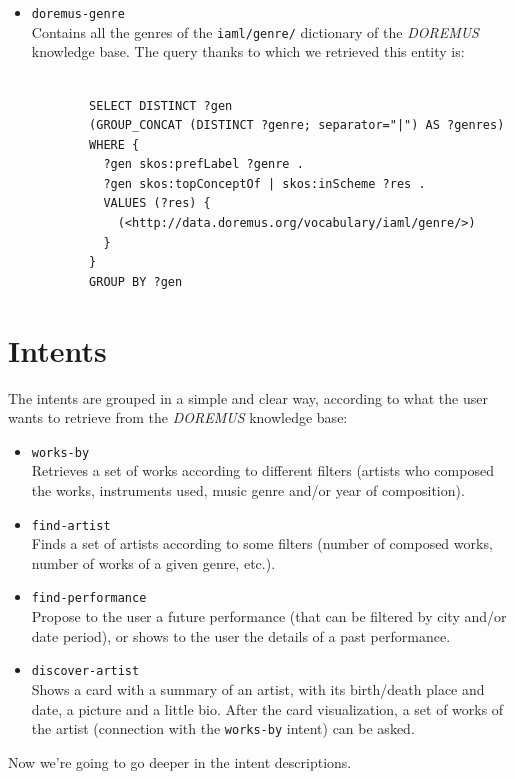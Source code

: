 \documentclass[a4paper,12pt]{report}
\begin{document}
\begin{itemize}
		\item \texttt{doremus-genre}\\
		Contains all the genres of the \texttt{iaml/genre/} dictionary of the \textit{DOREMUS} knowledge base. The query thanks to which we retrieved this entity is:
		\begin{lstlisting}
		
		SELECT DISTINCT ?gen
		(GROUP_CONCAT (DISTINCT ?genre; separator="|") AS ?genres)
		WHERE {
		  ?gen skos:prefLabel ?genre .
		  ?gen skos:topConceptOf | skos:inScheme ?res .
		  VALUES (?res) {
		    (<http://data.doremus.org/vocabulary/iaml/genre/>)
		  }
		}
		GROUP BY ?gen
		\end{lstlisting}
	\end{itemize}

	\section{Intents}
	The intents are grouped in a simple and clear way, according to what the user wants to retrieve from the \textit{DOREMUS} knowledge base:
	\begin{itemize}
		\item \texttt{works-by}\\
		Retrieves a set of works according to different filters (artists who composed the works, instruments used, music genre and/or year of composition).
		\item \texttt{find-artist}\\
		Finds a set of artists according to some filters (number of composed works, number of works of a given genre, etc.).
		\item \texttt{find-performance}\\
		Propose to the user a future performance (that can be filtered by city and/or date period), or shows to the user the details of a past performance.
		\item \texttt{discover-artist}\\
		Shows a card with a summary of an artist, with its birth/death place and date, a picture and a little bio. After the card visualization, a set of works of the artist (connection with the \texttt{works-by} intent) can be asked.
	\end{itemize}
	Now we're going to go deeper in the intent descriptions.
\end{document}

